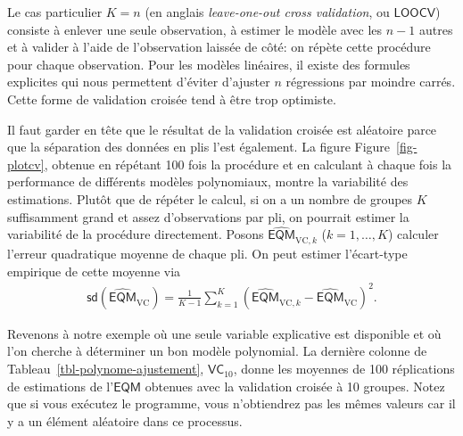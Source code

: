 \documentclass[
  11pt,
  letterpaper,
]{scrbook}
\newenvironment{Shaded}{\begin{snugshade}}{\end{snugshade}}
\newcommand{\AttributeTok}[1]{\textcolor[rgb]{0.40,0.45,0.13}{#1}}
\newcommand{\CommentTok}[1]{\textcolor[rgb]{0.37,0.37,0.37}{#1}}
\newcommand{\DecValTok}[1]{\textcolor[rgb]{0.68,0.00,0.00}{#1}}
\newcommand{\FunctionTok}[1]{\textcolor[rgb]{0.28,0.35,0.67}{#1}}
\newcommand{\NormalTok}[1]{\textcolor[rgb]{0.00,0.23,0.31}{#1}}
\newcommand{\OtherTok}[1]{\textcolor[rgb]{0.00,0.23,0.31}{#1}}
\newcommand{\SpecialCharTok}[1]{\textcolor[rgb]{0.37,0.37,0.37}{#1}}
\newcommand{\StringTok}[1]{\textcolor[rgb]{0.13,0.47,0.30}{#1}}
\theoremstyle{definition}
\theoremstyle{remark}
\begin{document}
\begin{Shaded}
\end{Shaded}

Le cas particulier \(K=n\) (en anglais \emph{leave-one-out cross
validation}, ou \(\mathsf{LOOCV}\)) consiste à enlever une seule
observation, à estimer le modèle avec les \(n-1\) autres et à valider à
l'aide de l'observation laissée de côté: on répète cette procédure pour
chaque observation. Pour les modèles linéaires, il existe des formules
explicites qui nous permettent d'éviter d'ajuster \(n\) régressions par
moindre carrés. Cette forme de validation croisée tend à être trop
optimiste.

Il faut garder en tête que le résultat de la validation croisée est
aléatoire parce que la séparation des données en plis l'est également.
La figure Figure~\ref{fig-plotcv}, obtenue en répétant 100 fois la
procédure et en calculant à chaque fois la performance de différents
modèles polynomiaux, montre la variabilité des estimations. Plutôt que
de répéter le calcul, si on a un nombre de groupes \(K\) suffisamment
grand et assez d'observations par pli, on pourrait estimer la
variabilité de la procédure directement. Posons
\(\widehat{\mathsf{EQM}}_{\text{VC}, k}\) (\(k=1, \ldots, K\)) calculer
l'erreur quadratique moyenne de chaque pli. On peut estimer l'écart-type
empirique de cette moyenne via \begin{align*}
\mathsf{sd}(\widehat{\mathsf{EQM}}_{\text{VC}}) = \frac{1}{K-1} \sum_{k=1}^{K} (\widehat{\mathsf{EQM}}_{\text{VC}, k}-\widehat{\mathsf{EQM}}_{\text{VC}})^2.
\end{align*}

Revenons à notre exemple où une seule variable explicative est
disponible et où l'on cherche à déterminer un bon modèle polynomial. La
dernière colonne de Tableau~\ref{tbl-polynome-ajustement},
\(\mathsf{VC}_{10}\), donne les moyennes de 100 réplications de
estimations de l'\(\mathsf{EQM}\) obtenues avec la validation croisée à
10 groupes. Notez que si vous exécutez le programme, vous n'obtiendrez
pas les mêmes valeurs car il y a un élément aléatoire dans ce processus.
\end{document}
